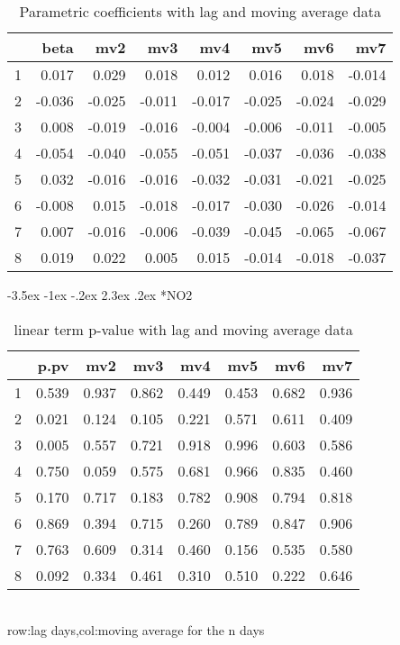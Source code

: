 \documentclass[a4paper, 12pt]{article}
\makeatletter
\def\large{\fontsize{14}{20}\selectfont}
\renewcommand\subsection{\@startsection {subsection}{1}{\z@}%
                                   {-3.5ex \@plus -1ex \@minus -.2ex}%
                                   {2.3ex \@plus.2ex}%
                                   {\centering\normalfont\large\bfseries}}
\makeatother
\begin{document}
\begin{table}[h]
\centering
\caption{Parametric coefficients with lag and moving average data}
\begin{tabular}{rrrrrrrr}
  \hline
 & beta & mv2 & mv3 & mv4 & mv5 & mv6 & mv7 \\
  \hline
1 & 0.017 & 0.029 & 0.018 & 0.012 & 0.016 & 0.018 & -0.014 \\
  2 & -0.036 & -0.025 & -0.011 & -0.017 & -0.025 & -0.024 & -0.029 \\
  3 & 0.008 & -0.019 & -0.016 & -0.004 & -0.006 & -0.011 & -0.005 \\
  4 & -0.054 & -0.040 & -0.055 & -0.051 & -0.037 & -0.036 & -0.038 \\
  5 & 0.032 & -0.016 & -0.016 & -0.032 & -0.031 & -0.021 & -0.025 \\
  6 & -0.008 & 0.015 & -0.018 & -0.017 & -0.030 & -0.026 & -0.014 \\
  7 & 0.007 & -0.016 & -0.006 & -0.039 & -0.045 & -0.065 & -0.067 \\
  8 & 0.019 & 0.022 & 0.005 & 0.015 & -0.014 & -0.018 & -0.037 \\
   \hline
\end{tabular}
\end{table}
\clearpage
\subsection*{NO2}
\begin{table}[h]
\centering
\caption{linear term p-value with lag and moving average data}
\begin{tabular}{rrrrrrrr}
  \hline
 & p.pv & mv2 & mv3 & mv4 & mv5 & mv6 & mv7 \\
  \hline
1 & 0.539 & 0.937 & 0.862 & 0.449 & 0.453 & 0.682 & 0.936 \\
  2 & 0.021 & 0.124 & 0.105 & 0.221 & 0.571 & 0.611 & 0.409 \\
  3 & 0.005 & 0.557 & 0.721 & 0.918 & 0.996 & 0.603 & 0.586 \\
  4 & 0.750 & 0.059 & 0.575 & 0.681 & 0.966 & 0.835 & 0.460 \\
  5 & 0.170 & 0.717 & 0.183 & 0.782 & 0.908 & 0.794 & 0.818 \\
  6 & 0.869 & 0.394 & 0.715 & 0.260 & 0.789 & 0.847 & 0.906 \\
  7 & 0.763 & 0.609 & 0.314 & 0.460 & 0.156 & 0.535 & 0.580 \\
  8 & 0.092 & 0.334 & 0.461 & 0.310 & 0.510 & 0.222 & 0.646 \\
   \hline
\end{tabular}
\\row:lag days,col:moving average for the n days
\end{table}
\end{document}

